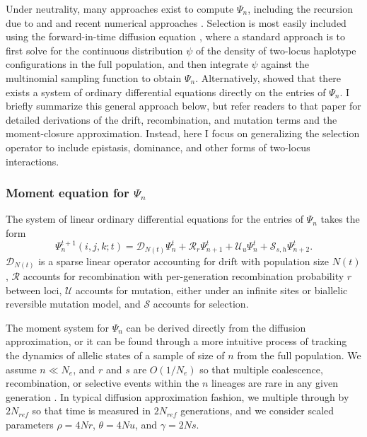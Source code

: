 \documentclass[]{article}
\begin{document}
Under neutrality, many approaches exist to compute \(\Psi_n\), including the
recursion due to \citet{Golding1984-pu} and \citet{Ethier1990-tb} and recent
numerical approaches \citep{Kamm2016-ag, Ragsdale2017-gg}. Selection is most
easily included using the forward-in-time diffusion equation
\citep{Kimura1955-qe,Hill1966-gv}, where a standard approach is to first solve
for the continuous distribution \(\psi\) of the density of two-locus haplotype
configurations in the full population, and then integrate \(\psi\) against the
multinomial sampling function to obtain \(\Psi_n\). Alternatively,
\citet{Ragsdale2019-nt} showed that there exists a system of ordinary
differential equations directly on the entries of \(\Psi_n\). I briefly
summarize this general approach below, but refer readers to that paper for
detailed derivations of the drift, recombination, and mutation terms and the
moment-closure approximation. Instead, here I focus on generalizing the
selection operator to include epistasis, dominance, and other forms of
two-locus interactions.

\subsubsection{Moment equation for \(\Psi_n\)}

The system of linear ordinary differential equations for the entries of
\(\Psi_n\) takes the form
\begin{equation}
\label{eq:system}
{\Psi}_n^{t+1}(i, j, k; t) =
\mathcal{D}_{N(t)}\Psi_n^t
+ \mathcal{R}_{r}\Psi_{n+1}^t
+ \mathcal{U}_{u}\Psi_n^t
+ \mathcal{S}_{s,h}\Psi_{n+2}^t.
\end{equation}
\(\mathcal{D}_{N(t)}\) is a sparse linear operator accounting for drift
with population size \(N(t)\), \(\mathcal{R}\) accounts for recombination
with per-generation recombination probability \(r\) between loci,
\(\mathcal{U}\) accounts for mutation, either under an infinite sites or
biallelic reversible mutation model, and \(\mathcal{S}\) accounts for
selection.

The moment system for \(\Psi_n\) can be derived directly from the diffusion
approximation, or it can be found through a more intuitive process of tracking
the dynamics of allelic states of a sample of size of \(n\) from the full
population. We assume \(n \ll N_e\), and \(r\) and \(s\) are \(O(1/N_e)\) so
that multiple coalescence, recombination, or selective events within the \(n\)
lineages are rare in any given generation \citep[Supporting
Information;][]{Jouganous2017-pq,Ragsdale2019-nt}. In typical diffusion
approximation fashion, we multiple through by \(2N_{ref}\) so that time is
measured in \(2N_{ref}\) generations, and we consider scaled parameters \(\rho
= 4Nr\), \(\theta = 4Nu\), and \(\gamma=2Ns\).
\end{document}
